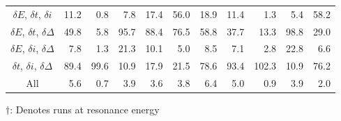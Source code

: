 \begin{table}
\begin{center}
\begin{tabular}{crrrrrrrrrr}
$\delta E$, $\delta t$, $\delta i$     &  11.2 &   0.8 &   7.8 &  17.4 &  56.0 &  18.9 &  11.4 &   1.3 &   5.4 &  58.2 \\
$\delta E$, $\delta t$, $\delta\Delta$ &  49.8 &   5.8 &  95.7 &  88.4 &  76.5 &  58.8 &  37.7 &  13.3 &  98.8 &  29.0 \\
$\delta E$, $\delta i$, $\delta\Delta$ &   7.8 &   1.3 &  21.3 &  10.1 &   5.0 &   8.5 &   7.1 &   2.8 &  22.8 &   6.6 \\
$\delta t$, $\delta i$, $\delta\Delta$ &  89.4 &  99.6 &  10.9 &  17.9 &  21.5 &  78.6 &  93.4 & 102.3 &  10.9 &  76.2 \\
All &   5.6 &   0.7 &   3.9 &   3.6 &   3.8 &   6.4 &   5.0 &   0.9 &   3.9 &   2.0 \\
            \bottomrule
        \end{tabular}

        \vspace{0.5em}
        {\fontsize{10}{12}\selectfont $\dagger$: Denotes runs at
        resonance energy}
    \end{center}
\end{table}

